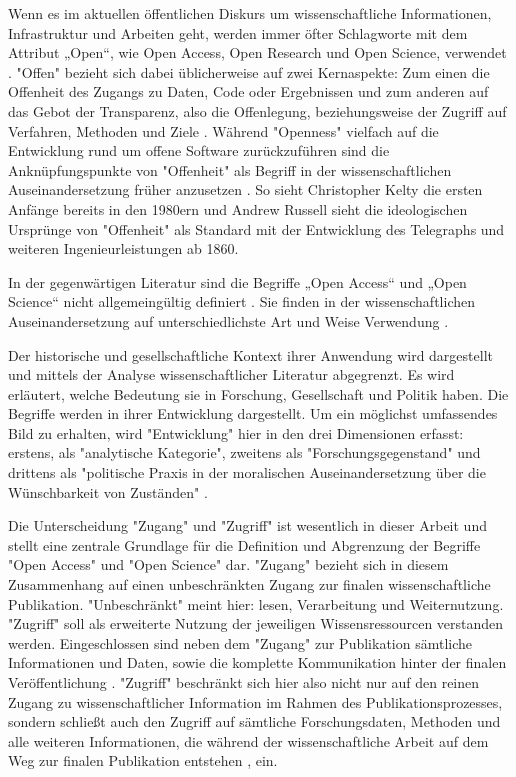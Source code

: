Wenn es im aktuellen öffentlichen Diskurs um wissenschaftliche Informationen, Infrastruktur und Arbeiten geht, werden immer öfter Schlagworte mit dem Attribut „Open“, wie Open Access, Open Research und Open Science, verwendet \cite{bunz_2014} \cite{schulze_2013_open}. "Offen" bezieht sich dabei üblicherweise auf zwei Kernaspekte: Zum einen die Offenheit des Zugangs zu Daten, Code oder Ergebnissen und zum anderen auf das Gebot der Transparenz, also die Offenlegung, beziehungsweise der Zugriff auf Verfahren, Methoden und Ziele \cite{schulze_2013_open}. Während "Openness" vielfach auf die Entwicklung rund um offene Software zurückzuführen sind die Anknüpfungspunkte von "Offenheit" als Begriff in der wissenschaftlichen Auseinandersetzung früher anzusetzen \cite{Tkacz_2014}. So sieht Christopher Kel­ty die ersten Anfänge bereits in den 1980ern \cite{kelty_2008_two_bits} und Andrew Russell sieht die ideologischen Ursprünge von "Offenheit" als Standard mit der Entwicklung des Telegraphs und weiteren Ingenieurleistungen ab 1860\cite{Russell_2014}.

In der gegenwärtigen Literatur sind die Begriffe „Open Access“ und „Open Science“ nicht allgemeingültig definiert \cite{suchen}. Sie finden in der wissenschaftlichen Auseinandersetzung auf unterschiedlichste Art und Weise Verwendung \cite{cite:9}. 

Der historische und gesellschaftliche Kontext ihrer Anwendung wird dargestellt und mittels der Analyse wissenschaftlicher Literatur abgegrenzt. Es wird erläutert, welche Bedeutung sie in Forschung, Gesellschaft und Politik haben. Die Begriffe werden in ihrer Entwicklung dargestellt. Um ein möglichst umfassendes Bild zu erhalten, wird "Entwicklung" hier in den drei Dimensionen erfasst: erstens, als "analytische Kategorie", zweitens als "Forschungsgegenstand" und drittens als "politische Praxis in der moralischen Auseinandersetzung über die Wünschbarkeit von Zuständen" \cite{cite:10}.

Die Unterscheidung "Zugang" und "Zugriff" ist wesentlich in dieser Arbeit und stellt eine zentrale Grundlage für die Definition und Abgrenzung der Begriffe "Open Access" und "Open Science" dar. "Zugang" bezieht sich in diesem Zusammenhang auf einen unbeschränkten Zugang zur finalen wissenschaftliche Publikation. "Unbeschränkt" meint hier: lesen\cite{cite:9a}, Verarbeitung und Weiternutzung. "Zugriff" soll als erweiterte Nutzung der jeweiligen Wissensressourcen verstanden werden. Eingeschlossen sind neben dem "Zugang" zur Publikation sämtliche Informationen und Daten, sowie die komplette Kommunikation hinter der finalen Veröffentlichung \cite{cite:9b}. "Zugriff" beschränkt sich hier also nicht nur auf den reinen Zugang zu wissenschaftlicher Information im Rahmen des Publikationsprozesses, sondern schließt auch den Zugriff auf sämtliche Forschungsdaten, Methoden und alle weiteren Informationen, die während der wissenschaftliche Arbeit auf dem Weg zur finalen Publikation entstehen \cite{cite:9c}, ein. 


